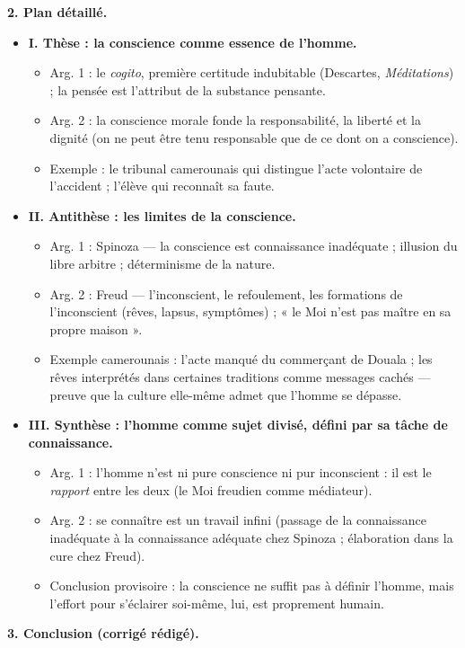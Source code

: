 \documentclass[11pt]{article}
\begin{document}
\begin{corrige}
\textbf{2. Plan détaillé.}
\begin{itemize}
\item \textbf{I. Thèse : la conscience comme essence de l'homme.}
\begin{itemize}
\item Arg. 1 : le \emph{cogito}, première certitude indubitable (Descartes, \emph{Méditations}) ; la pensée est l'attribut de la substance pensante.
\item Arg. 2 : la conscience morale fonde la responsabilité, la liberté et la dignité (on ne peut être tenu responsable que de ce dont on a conscience).
\item Exemple : le tribunal camerounais qui distingue l'acte volontaire de l'accident ; l'élève qui reconnaît sa faute.
\end{itemize}
\item \textbf{II. Antithèse : les limites de la conscience.}
\begin{itemize}
\item Arg. 1 : Spinoza — la conscience est connaissance inadéquate ; illusion du libre arbitre ; déterminisme de la nature.
\item Arg. 2 : Freud — l'inconscient, le refoulement, les formations de l'inconscient (rêves, lapsus, symptômes) ; « le Moi n'est pas maître en sa propre maison ».
\item Exemple camerounais : l'acte manqué du commerçant de Douala ; les rêves interprétés dans certaines traditions comme messages cachés — preuve que la culture elle-même admet que l'homme se dépasse.
\end{itemize}
\item \textbf{III. Synthèse : l'homme comme sujet divisé, défini par sa tâche de connaissance.}
\begin{itemize}
\item Arg. 1 : l'homme n'est ni pure conscience ni pur inconscient : il est le \emph{rapport} entre les deux (le Moi freudien comme médiateur).
\item Arg. 2 : se connaître est un travail infini (passage de la connaissance inadéquate à la connaissance adéquate chez Spinoza ; élaboration dans la cure chez Freud).
\item Conclusion provisoire : la conscience ne suffit pas à définir l'homme, mais l'effort pour s'éclairer soi-même, lui, est proprement humain.
\end{itemize}
\end{itemize}

\textbf{3. Conclusion (corrigé rédigé).}


\end{corrige}
\end{document}
